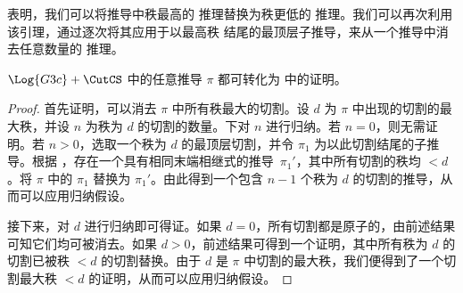 \documentclass[../../../include/open-logic-section]{subfiles}
\begin{document}

 表明，我们可以将推导中秩最高的 \CutCS{} 推理替换为秩更低的 \CutCS{} 推理。我们可以再次利用该引理，通过逐次将其应用于以最高秩 \CutCS{} 结尾的最顶层子推导，来从一个推导中消去任意数量的 \CutCS{} 推理。

\begin{thm}
$\Log{G3c} + \CutCS$ 中的任意推导 $\pi$ 都可转化为  中的证明。
\end{thm}

\begin{proof}
  首先证明，可以消去 $\pi$ 中所有秩最大的切割。设 $d$ 为 $\pi$ 中出现的切割的最大秩，并设 $n$ 为秩为 $d$ 的切割的数量。下对 $n$ 进行归纳。若 $n=0$，则无需证明。若 $n>0$，选取一个秩为 $d$ 的最顶层切割，并令 $\pi_1$ 为以此切割结尾的子推导。根据 ，存在一个具有相同末端相继式的推导~$\pi_1'$，其中所有切割的秩均 $<d$。将 $\pi$ 中的 $\pi_1$ 替换为 $\pi_1'$。由此得到一个包含 $n-1$ 个秩为 $d$ 的切割的推导，从而可以应用归纳假设。

  接下来，对 $d$ 进行归纳即可得证。如果 $d=0$，所有切割都是原子的，由前述结果可知它们均可被消去。如果 $d>0$，前述结果可得到一个证明，其中所有秩为 $d$ 的切割已被秩 $<d$ 的切割替换。由于 $d$ 是 $\pi$ 中切割的最大秩，我们便得到了一个切割最大秩 $<d$ 的证明，从而可以应用归纳假设。
\end{proof}
\end{document}
